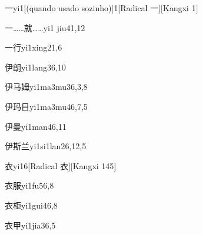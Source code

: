 \begin{verbete}{一}{yi1}[(quando usado sozinho)]{1}[Radical 一][Kangxi 1]
\end{verbete}

\begin{verbete}{一……就……}{yi1 jiu4}{1,12}
\end{verbete}

\begin{verbete}{一行}{yi1xing2}{1,6}
\end{verbete}

\begin{verbete}{伊朗}{yi1lang3}{6,10}
\end{verbete}

\begin{verbete}{伊马姆}{yi1ma3mu3}{6,3,8}
\end{verbete}

\begin{verbete}{伊玛目}{yi1ma3mu4}{6,7,5}
\end{verbete}

\begin{verbete}{伊曼}{yi1man4}{6,11}
\end{verbete}

\begin{verbete}{伊斯兰}{yi1si1lan2}{6,12,5}
\end{verbete}

\begin{verbete}{衣}{yi1}{6}[Radical 衣][Kangxi 145]
\end{verbete}

\begin{verbete}{衣服}{yi1fu5}{6,8}
\end{verbete}

\begin{verbete}{衣柜}{yi1gui4}{6,8}
\end{verbete}

\begin{verbete}{衣甲}{yi1jia3}{6,5}
\end{verbete}

